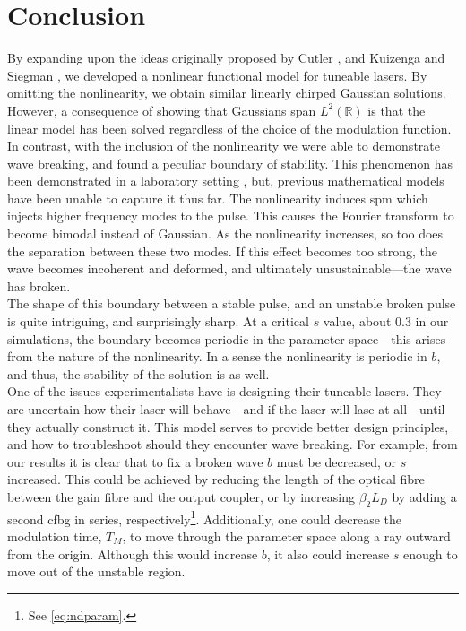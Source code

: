 
\chapter{Conclusion}
By expanding upon the ideas originally proposed by Cutler \cite{cutler}, and Kuizenga and Siegman \cite{kuizenga1970, kuizenga1970a, siegman}, we developed a nonlinear functional model for tuneable lasers. By omitting the nonlinearity, we obtain similar linearly chirped Gaussian solutions. However, a consequence of showing that Gaussians span $L^2(\mathbb{R})$ is that the linear model has been solved regardless of the choice of the modulation function. \\

In contrast, with the inclusion of the nonlinearity we were able to demonstrate wave breaking, and found a peculiar boundary of stability. This phenomenon has been demonstrated in a laboratory setting \cite{agrawal2013, anderson, finot, rothenberg, tomlinson}, but, previous mathematical models have been unable to capture it thus far. The nonlinearity induces \gls{spm} which injects higher frequency modes to the pulse. This causes the Fourier transform to become bimodal instead of Gaussian. As the nonlinearity increases, so too does the separation between these two modes. If this effect becomes too strong, the wave becomes incoherent and deformed, and ultimately unsustainable---the wave has broken. \\

The shape of this boundary between a stable pulse, and an unstable broken pulse is quite intriguing, and surprisingly sharp. At a critical $s$ value, about 0.3 in our simulations, the boundary becomes periodic in the parameter space---this arises from the nature of the nonlinearity. In a sense the nonlinearity is periodic in $b$, and thus, the stability of the solution is as well. \\

One of the issues experimentalists have is designing their tuneable lasers. They are uncertain how their laser will behave---and if the laser will lase at all---until they actually construct it. This model serves to provide better design principles, and how to troubleshoot should they encounter wave breaking. For example, from our results it is clear that to fix a broken wave $b$ must be decreased, or $s$ increased. This could be achieved by reducing the length of the optical fibre between the gain fibre and the output coupler, or by increasing $\beta_2 L_D$ by adding a second \gls{cfbg} in series, respectively\footnote{See \eqref{eq:ndparam}.}. Additionally, one could decrease  the modulation time, $T_M$, to move through the parameter space along a ray outward from the origin. Although this would increase $b$, it also could increase $s$ enough to move out of the unstable region. \\

